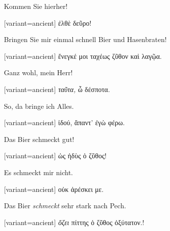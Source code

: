 Kommen Sie hierher!

\switchcolumn

\begin{greek}[variant=ancient]%
ἐλθὲ δεῦρο!

\end{greek}%
\switchcolumn*

Bringen Sie mir einmal schnell Bier und Hasenbraten!

\switchcolumn

\begin{greek}[variant=ancient]%
ἔνεγκέ μοι ταχέως ζῦθον καὶ λαγῷα.

\end{greek}%
\switchcolumn*

Ganz wohl, mein Herr!

\switchcolumn

\begin{greek}[variant=ancient]%
\emph{ταῦτα,} ὦ δέσποτα.

\end{greek}%
\switchcolumn*

So, da bringe ich Alles.

\switchcolumn

\begin{greek}[variant=ancient]%
ἰδού, ἅπαντ' ἐγὼ φέρω.

\end{greek}%
\switchcolumn*

Das Bier schmeckt gut!

\switchcolumn

\begin{greek}[variant=ancient]%
ὡς ἡδὺς ὁ ζῦθος!

\end{greek}%
\switchcolumn*

Es schmeckt mir nicht.

\switchcolumn

\begin{greek}[variant=ancient]%
οὐκ ἀρέσκει με.

\end{greek}%
\switchcolumn*

Das Bier \emph{schmeckt} sehr stark nach Pech.

\switchcolumn

\begin{greek}[variant=ancient]%
\emph{ὄζει} πίττης ὁ ζῦθος ὀξύτατον.!

\end{greek}%
\switchcolumn*

